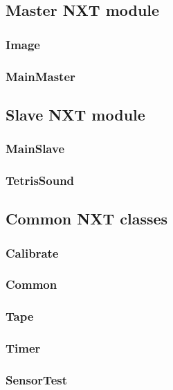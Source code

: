 \documentclass[%
  a4paper,%
  11pt,%
  blue,%
  hyperref	%
  ]{tubsartcl}
\begin{document}
\subsection{Master NXT module}

\subsubsection{Image}

\subsubsection{MainMaster}

\subsection{Slave NXT module}

\subsubsection{MainSlave}

\subsubsection{TetrisSound}


\subsection{Common NXT classes}

\subsubsection{Calibrate}

\subsubsection{Common}

\subsubsection{Tape}

\subsubsection{Timer}

\subsubsection{SensorTest}
\end{document}
